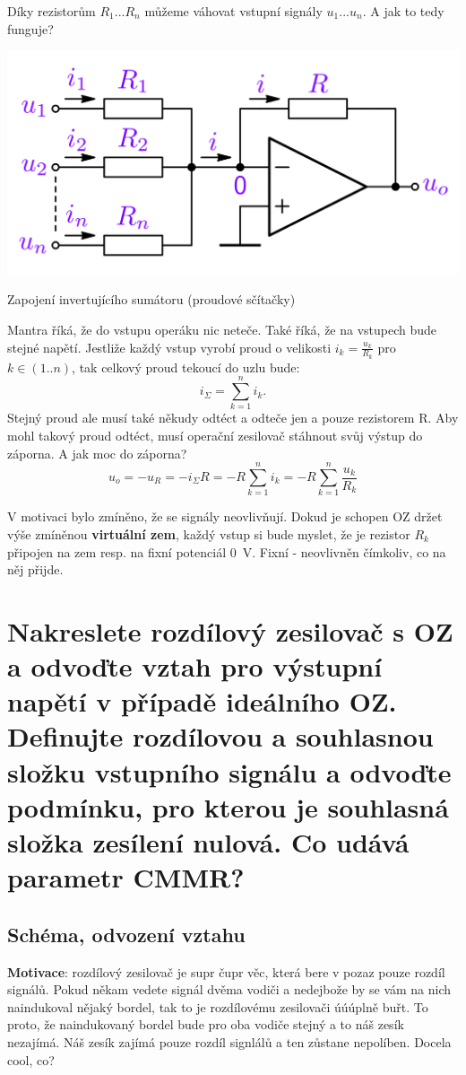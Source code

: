 \documentclass[a4paper,12pt]{article}   %
\begin{document}
Díky rezistorům $R_1 ... R_n$ můžeme váhovat vstupní signály $u_1 ... u_n$. A jak to tedy funguje?

\begin{schema}[h!]
    \centering
    \includegraphics[width=.5\textwidth]{invert-sumator.PNG}
    \caption{Zapojení invertujícího sumátoru (proudové sčítačky)}
    \label{sch:sumator}
\end{schema}

Mantra říká, že do vstupu operáku nic neteče. Také říká, že na vstupech bude stejné napětí. Jestliže každý vstup vyrobí proud o velikosti $i_k = \frac{u_k}{R_k}$ pro $k\in (1..n)$, tak celkový proud tekoucí do uzlu bude:
\begin{equation*}
    i_\Sigma=\sum_{k=1}^n i_k.
\end{equation*}
Stejný proud ale musí také někudy odtéct a odteče jen a pouze rezistorem R. Aby mohl takový proud odtéct, musí operační zesilovač stáhnout svůj výstup do záporna. A jak moc do záporna?
\begin{equation}
    u_o = -u_R = -i_\Sigma R = -R \sum_{k=1}^n i_k = -R \sum_{k=1}^n \frac{u_k}{R_k}
\end{equation}

V motivaci bylo zmíněno, že se signály neovlivňují. Dokud je schopen OZ držet výše zmíněnou \textbf{virtuální zem}, každý vstup si bude myslet, že je rezistor $R_k$ připojen na zem resp. na fixní potenciál 0~V. Fixní - neovlivněn čímkoliv, co na něj přijde.








\section{Nakreslete rozdílový zesilovač s OZ a odvoďte vztah pro výstupní napětí v případě ideálního OZ. Definujte rozdílovou a souhlasnou složku vstupního signálu a odvoďte podmínku, pro kterou je souhlasná složka zesílení nulová. Co udává parametr CMMR?}
\subsection*{Schéma, odvození vztahu}
\textbf{Motivace}: rozdílový zesilovač je supr čupr věc, která bere v pozaz pouze rozdíl signálů. Pokud někam vedete signál dvěma vodiči a nedejbože by se vám na nich naindukoval nějaký bordel, tak to je rozdílovému zesilovači úúúplně buřt. To proto, že naindukovaný bordel bude pro oba vodiče stejný a to náš zesík nezajímá. Náš zesík zajímá pouze rozdíl signlálů a ten zůstane nepolíben. Docela cool, co?
\end{document}
